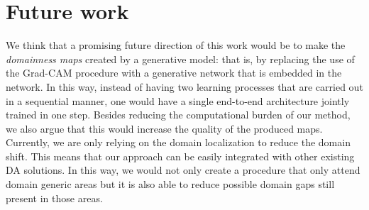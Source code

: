 \documentclass[../main.tex]{subfiles}
\begin{document}
    \section{Future work}
    We think that a promising future direction of this work would be to make the \textit{domainness maps}
    created by a generative model: that is, by replacing the use of the Grad-CAM procedure with a generative
    network that is embedded in the network. In this way, instead of having two learning processes that are
    carried out in a sequential manner, one would have a single end-to-end architecture jointly trained in one
    step. Besides reducing the computational burden of our method, we also argue that this would increase the
    quality of the produced maps. \\
    Currently, we are only relying on the domain localization to reduce the domain shift. This means that our
    approach can be easily integrated with other existing DA solutions. In this way, we would not only create a
    procedure that only attend domain generic areas but it is also able to reduce possible domain gaps still present
    in those areas.
\end{document}
